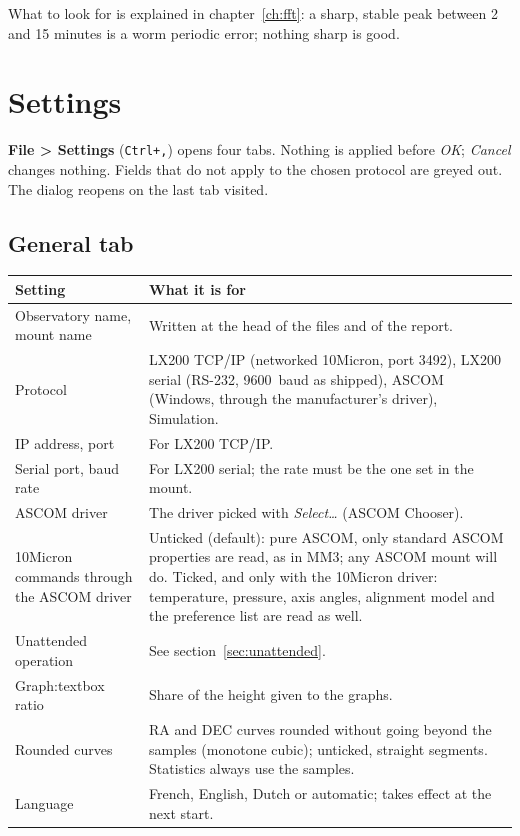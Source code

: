 What to look for is explained in chapter~\ref{ch:fft}: a sharp, stable peak
between 2 and 15 minutes is a worm periodic error; nothing sharp is good.

\chapter{Settings}
\label{ch:config}

\textbf{File > Settings} (\texttt{Ctrl+,}) opens four tabs. Nothing is
applied before \emph{OK}; \emph{Cancel} changes nothing. Fields that do not
apply to the chosen protocol are greyed out. The dialog reopens on the last
tab visited.

\needspace{0.6\textheight}
\section{General tab}
\label{sec:conn}


\begin{center}
\begin{tabularx}{\textwidth}{lX}
\toprule
\textbf{Setting} & \textbf{What it is for} \\
\midrule
Observatory name, mount name & Written at the head of the files and of the
report. \\
Protocol & LX200 TCP/IP (networked 10Micron, port 3492), LX200 serial
(RS-232, 9600~baud as shipped), ASCOM (Windows, through the manufacturer's
driver), Simulation. \\
IP address, port & For LX200 TCP/IP. \\
Serial port, baud rate & For LX200 serial; the rate must be the one set in the
mount. \\
ASCOM driver & The driver picked with \emph{Select\ldots} (ASCOM Chooser). \\
10Micron commands through the ASCOM driver & Unticked (default): pure ASCOM,
only standard ASCOM properties are read, as in MM3; any ASCOM mount will do.
Ticked, and only with the 10Micron driver: temperature, pressure, axis angles,
alignment model and the preference list are read as well. \\
Unattended operation & See section~\ref{sec:unattended}. \\
Graph:textbox ratio & Share of the height given to the graphs. \\
Rounded curves & RA and DEC curves rounded without going beyond the samples
(monotone cubic); unticked, straight segments. Statistics always use the
samples. \\
Language & French, English, Dutch or automatic; takes effect at the next
start. \\
\bottomrule
\end{tabularx}
\end{center}

